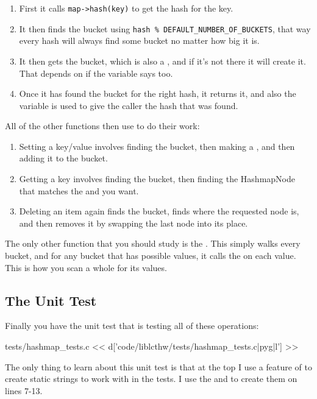 \begin{enumerate}
\item First it calls \verb|map->hash(key)| to get the hash for the key.
\item It then finds the bucket using \verb|hash % DEFAULT_NUMBER_OF_BUCKETS|, that
    way every hash will always find some bucket no matter how big it is.
\item It then gets the bucket, which is also a , and if it's 
    not there it will create it.  That depends on if the 
    variable says too.
\item Once it has found the  bucket for the right hash,
    it returns it, and also the  variable is used to
    give the caller the hash that was found.
\end{enumerate}

All of the other functions then use  to do 
their work:

\begin{enumerate}
\item Setting a key/value involves finding the bucket, then
making a , and then adding it to the bucket.  
\item Getting a key involves finding the bucket, then finding the HashmapNode
that matches the  and  you want.
\item Deleting an item again finds the bucket, finds where the requested node
is, and then removes it by swapping the last node into its place.
\end{enumerate}

The only other function that you should study is the .
This simply walks every bucket, and for any bucket that has possible
values, it calls the  on each value.  This is how you
scan a whole  for its values.

\subsection{The Unit Test}

Finally you have the unit test that is testing all of these operations:

\begin{code}{tests/hashmap\_tests.c}
<< d['code/liblcthw/tests/hashmap_tests.c|pyg|l'] >>
\end{code}

The only thing to learn about this unit test is that at the top I use
a feature of  to create static strings to work with 
in the tests.  I use the  and  
to create them on lines 7-13.

